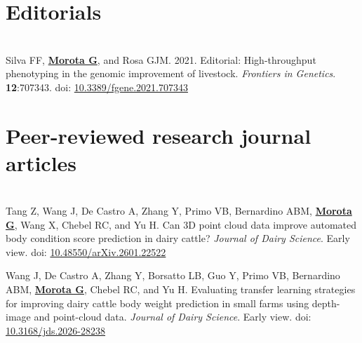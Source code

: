\documentclass[margin,line,10pt]{res}
\newenvironment{list1}{
  \begin{list}{\ding{113}}{%
      \setlength{\itemsep}{0in}
      \setlength{\parsep}{0in} \setlength{\parskip}{0in}
      \setlength{\topsep}{0in} \setlength{\partopsep}{0in} 
      \setlength{\leftmargin}{0.17in}}}{\end{list}}
\begin{document}
\begin{resume}
\begin{list1}
\end{list1}


\vspace{0.5cm}
\section{\sc Editorials}
\vspace{1.0cm}

\section{}
\begin{list1}
\item [{\bf 1}.]  Silva FF, {\bf \underline{Morota G}}, and Rosa GJM. 2021. Editorial: High-throughput phenotyping in the genomic improvement of livestock. \emph{Frontiers in Genetics}. \textbf{12}:707343. doi: \textcolor{blue}{\href{https://doi.org/10.3389/fgene.2021.707343}{10.3389/fgene.2021.707343}}
\end{list1}



\section{\sc Peer-reviewed research journal articles}

\vspace{1.5cm}


\section{}
\begin{list1}


  \item  [{\bf 99}.] Tang Z, Wang J, De Castro A, Zhang Y, Primo VB, Bernardino ABM, \textbf{\underline{Morota G}}, Wang X, Chebel RC, and Yu H. Can 3D point cloud data improve automated body condition score prediction in dairy cattle? \emph{Journal of Dairy Science}. Early view. doi: \textcolor{blue}{\href{https://doi.org/10.48550/arXiv.2601.22522}{10.48550/arXiv.2601.22522}}


  \vspace{0.5cm}

  \item  [{\bf 98}.]  Wang J, De Castro A,  Zhang Y, Borsatto LB, Guo Y, Primo VB, Bernardino ABM, \textbf{\underline{Morota G}}, Chebel RC, and Yu H. Evaluating transfer learning strategies for improving dairy cattle body weight prediction in small farms using depth-image and point-cloud data. \emph{Journal of Dairy Science}. Early view. doi: \textcolor{blue}{\href{https://doi.org/10.3168/jds.2026-28238}{10.3168/jds.2026-28238}}



\end{list1}
\end{resume}
\end{document}
